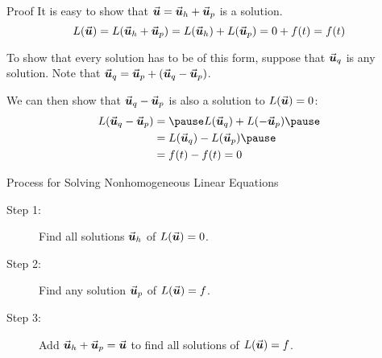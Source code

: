 \documentclass{beamer}
\begin{document}
\begin{frame}
\begin{block}{Proof}
It is easy to show that ${\vec{\boldsymbol{u}}}={\vec{\boldsymbol{u}}}_h+{\vec{\boldsymbol{u}}}_p$ is a solution.
\begin{equation*}
L({\vec{\boldsymbol{u}}}) = L({\vec{\boldsymbol{u}}}_h+{\vec{\boldsymbol{u}}}_p) = L({\vec{\boldsymbol{u}}}_h) + L({\vec{\boldsymbol{u}}}_p) = 0 + f(t) = f(t)
\end{equation*}\pause

\vspace{-5mm}
To show that every solution has to be of this form, suppose that ${\vec{\boldsymbol{u}}}_q$ is any solution. Note that ${\vec{\boldsymbol{u}}}_q={\vec{\boldsymbol{u}}}_p + ({\vec{\boldsymbol{u}}}_q - {\vec{\boldsymbol{u}}}_p)$.\pause

\vspace{2mm}
We can then show that ${\vec{\boldsymbol{u}}}_q-{\vec{\boldsymbol{u}}}_p$ is also a solution to $L({\vec{\boldsymbol{u}}})=0$:
\begin{equation*}
\begin{aligned}
L(\vect{u}_q-\vect{u}_p) &=\pause  L(\vect{u}_q) + L(-\vect{u}_p)\pause \\
&= L(\vect{u}_q)-L(\vect{u}_p)\pause \\
&= f(t) - f(t) = 0
\end{aligned}
\end{equation*}
\end{block}\pause
\begin{block}{Process for Solving Nonhomogeneous Linear Equations}
\begin{description}
\item[Step 1:] Find all solutions ${\vec{\boldsymbol{u}}}_h$ of $L({\vec{\boldsymbol{u}}})=0$.
\item[Step 2:] Find any solution ${\vec{\boldsymbol{u}}}_p$ of $L({\vec{\boldsymbol{u}}})=f$.
\item[Step 3:] Add ${\vec{\boldsymbol{u}}}_h+{\vec{\boldsymbol{u}}}_p={\vec{\boldsymbol{u}}}$ to find all solutions of $L({\vec{\boldsymbol{u}}})=f$.
\end{description}
\end{block}
\end{frame}
\end{document}
